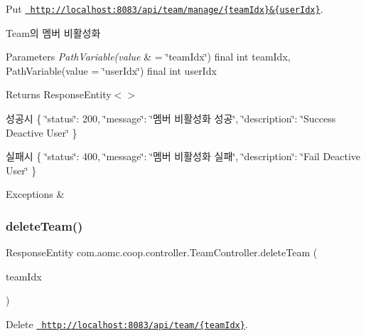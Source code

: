 Put \href{http://localhost:8083/api/team/manage/{teamIdx}&{userIdx}}{\texttt{ http\+://localhost\+:8083/api/team/manage/\{team\+Idx\}\&\{user\+Idx\}}}. 

Team의 멤버 비활성화


\begin{DoxyParams}{Parameters}
{\em Path\+Variable(value} & = \char`\"{}team\+Idx\char`\"{}) final int team\+Idx, Path\+Variable(value = \char`\"{}user\+Idx\char`\"{}) final int user\+Idx\\
\hline
\end{DoxyParams}
\begin{DoxyReturn}{Returns}
Response\+Entity$<$$>$
\end{DoxyReturn}
성공시 \{ \char`\"{}status\char`\"{}\+: 200, \char`\"{}message\char`\"{}\+: \char`\"{}멤버 비활성화 성공\char`\"{}, \char`\"{}description\char`\"{}\+: \char`\"{}\+Success Deactive User\char`\"{} \}

실패시 \{ \char`\"{}status\char`\"{}\+: 400, \char`\"{}message\char`\"{}\+: \char`\"{}멤버 비활성화 실패\char`\"{}, \char`\"{}description\char`\"{}\+: \char`\"{}\+Fail Deactive User\char`\"{} \}


\begin{DoxyExceptions}{Exceptions}
{\em } & \\
\hline
\end{DoxyExceptions}
\mbox{\label{classcom_1_1aomc_1_1coop_1_1controller_1_1_team_controller_ad91980399a0c2439032d93aaa5131077}} 
\subsubsection{\texorpdfstring{deleteTeam()}{deleteTeam()}}
{\footnotesize\ttfamily Response\+Entity com.\+aomc.\+coop.\+controller.\+Team\+Controller.\+delete\+Team (\begin{DoxyParamCaption}\item[{@Path\+Variable(value=\char`\"{}team\+Idx\char`\"{}) final int}]{team\+Idx }\end{DoxyParamCaption})}



Delete \href{http://localhost:8083/api/team/{teamIdx}}{\texttt{ http\+://localhost\+:8083/api/team/\{team\+Idx\}}}. 

